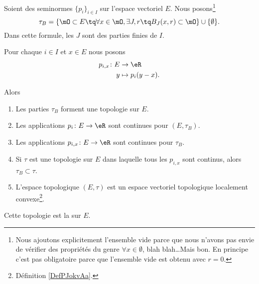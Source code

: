\begin{propositionDef}      \label{DEFooZTKAooWYUyDa}
	Soient des seminormes \( \{ p_i \}_{i\in I}\) sur l'espace vectoriel \( E\). Nous posons\footnote{Nous ajoutons explicitement l'ensemble vide parce que nous n'avons pas envie de vérifier des propriétés du genre \( \forall x\in\emptyset\), blah blah\ldots Mais bon. En principe c'est pas obligatoire parce que l'ensemble vide est obtenu avec \( r=0\).}
	\begin{equation}
		\tau_B=\{ \mO\subset E\tq \forall x\in\mO, \exists J,r\tq B_J(x,r)\subset \mO \}\cup\{ \emptyset \}.
	\end{equation}
	Dans cette formule, les \( J\) sont des parties finies de \( I\).

	Pour chaque \( i\in I\) et \( x\in E\) nous posons
	\begin{equation}
		\begin{aligned}
			p_{i,x}\colon E & \to \eR           \\
			y               & \mapsto p_i(y-x).
		\end{aligned}
	\end{equation}

	Alors
	\begin{enumerate}
		\item		\label{ITEMooQPVRooKyOBPi}
		      Les parties \( \tau_B\) forment une topologie sur \( E\).
		\item \label{ITEMooQIYWooAmPCdI}
		      Les applications \(p_i \colon E\to \eR  \) sont continues pour \( (E,\tau_B)\).
		\item		\label{ITEMooYGNWooYhBzSa}
		      Les applications \( p_{i,x} \colon E\to \eR  \) sont continues pour \( \tau_B\).
		\item		\label{ITEMooMUUZooBKBhsH}
		      Si \( \tau\) est une topologie sur \( E\) dans laquelle tous les \( p_{i,x}\) sont continus, alors \( \tau_B\subset\tau\).
		\item		\label{ITEMooEGVFooNqDkdN}
		      L'espace topologique \( (E,\tau)\) est un espace vectoriel topologique localement convexe\footnote{Définition \ref{DefPJokvAa}.}.
	\end{enumerate}

	Cette topologie est la  sur \( E\).
\end{propositionDef}

